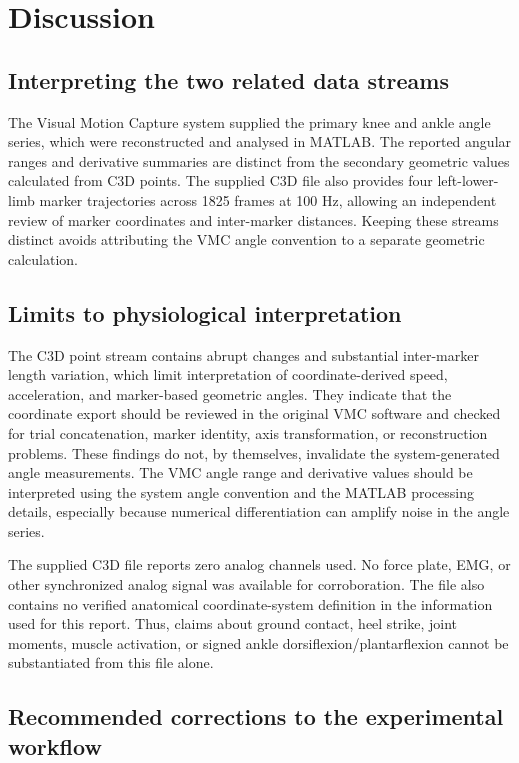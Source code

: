\documentclass[12pt,a4paper]{article}
\begin{document}
\section{Discussion}

\subsection{Interpreting the two related data streams}

The Visual Motion Capture system supplied the primary knee and ankle angle series, which were reconstructed and analysed in MATLAB. The reported angular ranges and derivative summaries are distinct from the secondary geometric values calculated from C3D points. The supplied C3D file also provides four left-lower-limb marker trajectories across 1825 frames at 100 Hz, allowing an independent review of marker coordinates and inter-marker distances. Keeping these streams distinct avoids attributing the VMC angle convention to a separate geometric calculation.

\subsection{Limits to physiological interpretation}

The C3D point stream contains abrupt changes and substantial inter-marker length variation, which limit interpretation of coordinate-derived speed, acceleration, and marker-based geometric angles. They indicate that the coordinate export should be reviewed in the original VMC software and checked for trial concatenation, marker identity, axis transformation, or reconstruction problems. These findings do not, by themselves, invalidate the system-generated angle measurements. The VMC angle range and derivative values should be interpreted using the system angle convention and the MATLAB processing details, especially because numerical differentiation can amplify noise in the angle series.

The supplied C3D file reports zero analog channels used. No force plate, EMG, or other synchronized analog signal was available for corroboration. The file also contains no verified anatomical coordinate-system definition in the information used for this report. Thus, claims about ground contact, heel strike, joint moments, muscle activation, or signed ankle dorsiflexion/plantarflexion cannot be substantiated from this file alone.

\subsection{Recommended corrections to the experimental workflow}
\end{document}
